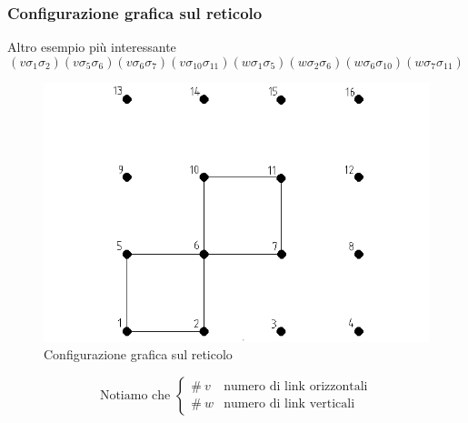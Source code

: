 \documentclass[11pt]{beamer}
\begin{document}
\begin{frame}
\frametitle{Configurazione grafica sul reticolo}
Altro esempio più interessante
$$(v\sigma_{1}\sigma_{2})(v\sigma_{5}\sigma_{6})(v\sigma_{6}\sigma_{7})(v\sigma_{10}\sigma_{11})(w\sigma_{1}\sigma_{5})(w\sigma_{2}\sigma_{6})(w\sigma_{6}\sigma_{10})(w\sigma_{7}\sigma_{11})
$$
\begin{figure}[r]
	\centering
	\includegraphics[width=0.5\columnwidth]{sat22}
	\caption{Configurazione grafica sul reticolo}
	\label{fig1}
	\end{figure}
$$
\mbox{Notiamo che \ } \begin{cases} \# \ v & \mbox{numero  di  link  orizzontali} \\ \# \ w & \mbox{numero di link verticali}
\end{cases}
$$

\end{frame}
	

 
\end{document}
